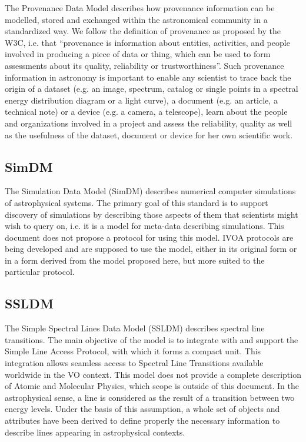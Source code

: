 \documentclass[11pt,letter]{ivoa}
\begin{document}
The Provenance Data Model \citep{2020ivoa.spec.0411S} describes how
provenance information can be modelled, stored
and exchanged within the astronomical community in a standardized way.
We follow the
definition of provenance as proposed by the W3C, i.e. that ``provenance
is information
about entities, activities, and people involved in producing a piece of
data or thing,
which can be used to form assessments about its quality, reliability or
trustworthiness''.
Such provenance information in astronomy is important to enable any
scientist to trace
back the origin of a dataset (e.g. an image, spectrum, catalog or single
points in a
spectral energy distribution diagram or a light curve), a document (e.g.
an article, a
technical note) or a device (e.g. a camera, a telescope), learn about
the people and
organizations involved in a project and assess the reliability, quality
as well as the
usefulness of the dataset, document or device for her own scientific
work.

\subsection{SimDM}

The Simulation Data Model (SimDM) \citep{2012ivoa.spec.0503L} describes
numerical computer simulations of astrophysical systems.
The primary goal of this standard is to support discovery of simulations
by describing those
aspects of them that scientists might wish to query on, i.e. it is a
model for meta-data
describing simulations. This document does not propose a protocol for
using this model.
IVOA protocols are being developed and are supposed to use the model,
either in its original
form or in a form derived from the model proposed here, but more suited
to the particular protocol.

\subsection{SSLDM}

The Simple Spectral Lines Data Model (SSLDM) \citep{2010ivoa.spec.1209O}
describes spectral line transitions. The main objective of
the model is to integrate with and support the Simple Line Access
Protocol, with which it forms
a compact unit. This integration allows seamless access to Spectral Line
Transitions available
worldwide in the VO context. This model does not provide a complete
description of Atomic and
Molecular Physics, which scope is outside of this document. In the
astrophysical sense, a line
is considered as the result of a transition between two energy levels.
Under the basis of this
assumption, a whole set of objects and attributes have been derived to
define properly the
necessary information to describe lines appearing in astrophysical
contexts.
\end{document}
